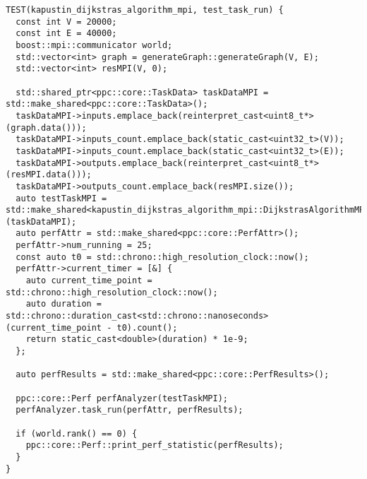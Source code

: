 \documentclass[a4paper,14pt]{extarticle}
\begin{document}
\begin{lstlisting}[caption={Пример теста для taskrun}]
TEST(kapustin_dijkstras_algorithm_mpi, test_task_run) {
  const int V = 20000;
  const int E = 40000;
  boost::mpi::communicator world;
  std::vector<int> graph = generateGraph::generateGraph(V, E);
  std::vector<int> resMPI(V, 0);

  std::shared_ptr<ppc::core::TaskData> taskDataMPI = std::make_shared<ppc::core::TaskData>();
  taskDataMPI->inputs.emplace_back(reinterpret_cast<uint8_t*>(graph.data()));
  taskDataMPI->inputs_count.emplace_back(static_cast<uint32_t>(V));
  taskDataMPI->inputs_count.emplace_back(static_cast<uint32_t>(E));
  taskDataMPI->outputs.emplace_back(reinterpret_cast<uint8_t*>(resMPI.data()));
  taskDataMPI->outputs_count.emplace_back(resMPI.size());
  auto testTaskMPI = std::make_shared<kapustin_dijkstras_algorithm_mpi::DijkstrasAlgorithmMPI>(taskDataMPI);
  auto perfAttr = std::make_shared<ppc::core::PerfAttr>();
  perfAttr->num_running = 25;
  const auto t0 = std::chrono::high_resolution_clock::now();
  perfAttr->current_timer = [&] {
    auto current_time_point = std::chrono::high_resolution_clock::now();
    auto duration = std::chrono::duration_cast<std::chrono::nanoseconds>(current_time_point - t0).count();
    return static_cast<double>(duration) * 1e-9;
  };

  auto perfResults = std::make_shared<ppc::core::PerfResults>();

  ppc::core::Perf perfAnalyzer(testTaskMPI);
  perfAnalyzer.task_run(perfAttr, perfResults);

  if (world.rank() == 0) {
    ppc::core::Perf::print_perf_statistic(perfResults);
  }
}
\end{lstlisting}
\end{document}
